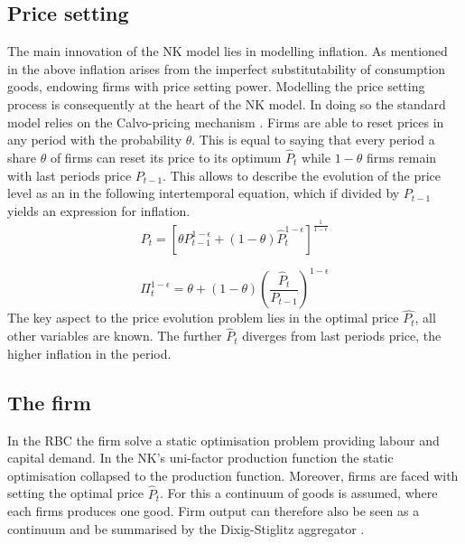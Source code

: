 \documentclass[12pt,a4paper,english]{article} %
\begin{document}
	\subsection{Price setting} \label{nk_price_setting}
	The main innovation of the NK model lies in modelling inflation. As mentioned in the above inflation arises from the imperfect substitutability of consumption goods, endowing firms with price setting power. Modelling the price setting process is consequently at the heart of the NK model. In doing so the standard model relies on the Calvo-pricing mechanism \cite{calvo_staggered_1983}. Firms are able to reset prices in any period with the probability $\theta$. This is equal to saying that every period a share $\theta$ of firms can reset its price to its optimum $\hat{P}_t$ while $1-\theta$ firms remain with last periods price $P_{t-1}$. This allows to describe the evolution of the price level as an in the following intertemporal equation, which if divided by $P_{t-1}$ yields an expression for inflation.
	\begin{equation}
		P_t = 
		\left[
		\theta P_{t-1}^{1 - \epsilon} + (1 - \theta) \hat{P}_t^{1 - \epsilon}
		\right]^{\frac{1}{1 - \epsilon}}
	\end{equation}

	\begin{equation} \label{eq:inflation}
		\Pi_t^{1-\epsilon} = \theta + (1 - \theta) \left(\frac{\hat{P}_t}{P_{t-1}} \right)^{1-\epsilon}
	\end{equation}
	The key aspect to the price evolution problem lies in the optimal price $\hat{P_t}$, all other variables are known. The further $\hat{P}_t$ diverges from last periods price, the higher inflation in the period. 
	
	\subsection{The firm} \label{nk_the_firm}
	In the RBC the firm solve a static optimisation problem providing labour and capital demand. In the NK's uni-factor production function the static optimisation collapsed to the production function. Moreover, firms are faced with setting the optimal price $\hat{P}_t$. For this a continuum of goods is assumed, where each firms produces one good. Firm output can therefore also be seen as a continuum and be summarised by the Dixig-Stiglitz aggregator \cite{dixit_monopolistic_1977}. 
	
\end{document}
